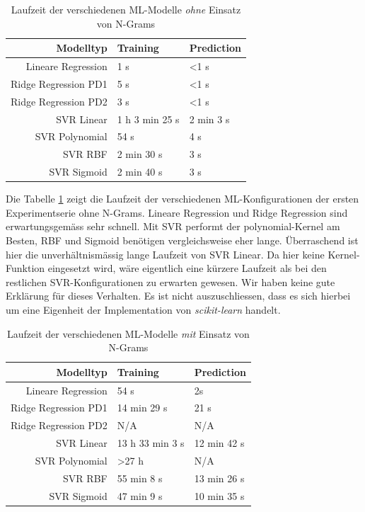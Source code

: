 \documentclass[10pt, a4paper]{article}
\begin{document}
\begin{table}[ht]
	\begin{tabular}[c]{|r|l|l|}
		\hline
		\textbf{Modelltyp}		& \textbf{Training}	& \textbf{Prediction}	\\ \hline
		Lineare Regression		& 1 s				& \textless 1 s			\\ \hline
		Ridge Regression PD1 	& 5 s				& \textless 1 s			\\ \hline
		Ridge Regression PD2	& 3 s				& \textless 1 s			\\ \hline
		SVR Linear				& 1 h 3 min 25 s 	& 2 min 3 s				\\ \hline
		SVR Polynomial			& 54 s				& 4 s					\\ \hline
		SVR RBF					& 2 min 30 s		& 3 s					\\ \hline
		SVR Sigmoid				& 2 min 40 s		& 3 s					\\ \hline
	\end{tabular}
	\centering
	\caption{Laufzeit der verschiedenen \ac{ML}-Modelle \emph{ohne} Einsatz von N-Grams}
	\label{tab:runtime_without_ngrams}
\end{table}

Die Tabelle \ref{tab:runtime_without_ngrams} zeigt die Laufzeit der verschiedenen \ac{ML}-Konfigurationen der ersten Experimentserie ohne N-Grams. Lineare Regression und Ridge Regression sind erwartungsgemäss sehr schnell. Mit SVR performt der polynomial-Kernel am Besten, \ac{RBF} und Sigmoid benötigen vergleichsweise eher lange. Überraschend ist hier die unverhältnismässig lange Laufzeit von SVR Linear. Da hier keine Kernel-Funktion eingesetzt wird, wäre eigentlich eine kürzere Laufzeit als bei den restlichen SVR-Konfigurationen zu erwarten gewesen. Wir haben keine gute Erklärung für dieses Verhalten. Es ist nicht auszuschliessen, dass es sich hierbei um eine Eigenheit der Implementation von \emph{scikit-learn} handelt.

\begin{table}[ht]
	\begin{tabular}[c]{|r|l|l|}
		\hline
		\textbf{Modelltyp}		& \textbf{Training}	& \textbf{Prediction}	\\ \hline
		Lineare Regression		& 54 s				& 2s					\\ \hline
		Ridge Regression PD1 	& 14 min 29 s		& 21 s					\\ \hline
		Ridge Regression PD2	& N/A				& N/A					\\ \hline
		SVR Linear				& 13 h 33 min 3 s	& 12 min 42 s			\\ \hline
		SVR Polynomial			& \textgreater 27 h & N/A					\\ \hline
		SVR \ac{RBF}					& 55 min 8 s		& 13 min 26 s			\\ \hline
		SVR Sigmoid				& 47 min 9 s		& 10 min 35 s			\\ \hline
	\end{tabular}
	\centering
	\caption{Laufzeit der verschiedenen \ac{ML}-Modelle \emph{mit} Einsatz von N-Grams}
	\label{tab:runtime_with_ngrams}
\end{table}
\end{document}
